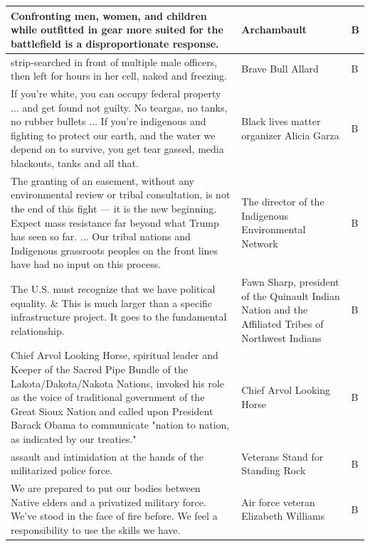 \begin{footnotesize}
\begin{spacing}{1}
\begin{longtable}{| p{} | P{.25\textwidth} | p{.07\textwidth}|}
Confronting men, women, and children while outfitted in gear more suited for the battlefield is a disproportionate response.                                          & Archambault                                  & B              \\  strip-searched in front of multiple male officers, then left for hours in her cell, naked and freezing.                                             & Brave Bull Allard                            & B              \\ \hline
If you're white, you can occupy federal property ... and get found not guilty. No teargas, no tanks, no rubber bullets ... If you're indigenous and fighting to protect our earth, and the water we depend on to survive, you get tear gassed, media blackouts, tanks and all that.                                         & Black lives matter organizer Alicia Garza    & B              \\ \hline
The granting of an easement, without any environmental review or tribal consultation, is not the end of this fight — it is the new beginning. Expect mass resistance far beyond what Trump has seen so far. ... Our tribal nations and Indigenous grassroots peoples on the front lines have had no input on this process.  & The director of the Indigenous Environmental Network                                                           & B              \\ \hline
The U.S. must recognize that we have political equality.                                            \& This is much larger than a specific infrastructure project. It goes to the fundamental relationship.           & Fawn Sharp, president of the Quinault Indian Nation and the Affiliated Tribes of Northwest Indians & B \\ \hline
Chief Arvol Looking Horse, spiritual leader and Keeper of the Sacred Pipe Bundle of the Lakota/Dakota/Nakota Nations, invoked his role as the voice of traditional government of the Great Sioux Nation and called upon President Barack Obama to communicate "nation to nation, as indicated by our treaties."             & Chief Arvol Looking Horse                    & B              \\ \hline
assault and intimidation at the hands of the militarized police force.                              & Veterans Stand for Standing Rock             & B              \\ \hline
We are prepared to put our bodies between Native elders and a privatized military force. We've stood in the face of fire before. We feel a responsibility to use the skills we have.                                                                      & Air force veteran Elizabeth Williams         & B              \\ \hline

\end{longtable}
\end{spacing}
\end{footnotesize}
